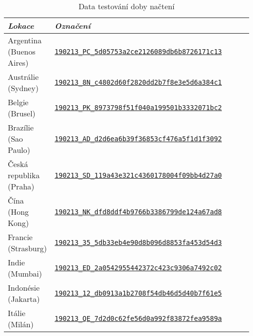 \documentclass[a4paper, 12pt]{article}
\newcommand{\ra}[1]{\renewcommand{\arraystretch}{#1}} %
\begin{document}
  \begin{table}[H]
    \caption{Data testování doby načtení}
    \label{tab:Data testování doby načtení}
    \footnotesize
    \centering
    \ra{1.3}
    \begin{tabular}{*5l}
      \toprule
      \emph{Lokace}            & \emph{Označení}                      \\ \midrule
      Argentina (Buenos Aires)        & \href{https://www.webpagetest.org/result/190213_PC_5d05753a2ce2126089db6b8726171c13}{\texttt{190213\_PC\_5d05753a2ce2126089db6b8726171c13}} \\
      Austrálie (Sydney)              & \href{https://www.webpagetest.org/result/190213_8N_c4802d60f2820dd2b7f8e3e5d6a384c1}{\texttt{190213\_8N\_c4802d60f2820dd2b7f8e3e5d6a384c1}} \\
      Belgie (Brusel)                 & \href{https://www.webpagetest.org/result/190213_PK_8973798f51f040a199501b3332071bc2}{\texttt{190213\_PK\_8973798f51f040a199501b3332071bc2}} \\
      Brazílie (Sao Paulo)            & \href{https://www.webpagetest.org/result/190213_AD_d2d6ea6b39f36853cf476a5f1d1f3092}{\texttt{190213\_AD\_d2d6ea6b39f36853cf476a5f1d1f3092}} \\
      Česká republika (Praha)         & \href{https://www.webpagetest.org/result/190213_SD_119a43e321c4360178004f09bb4d27a0}{\texttt{190213\_SD\_119a43e321c4360178004f09bb4d27a0}} \\
      Čína (Hong Kong)                & \href{https://www.webpagetest.org/result/190213_NK_dfd8ddf4b9766b3386799de124a67ad8}{\texttt{190213\_NK\_dfd8ddf4b9766b3386799de124a67ad8}} \\
      Francie (Strasburg)             & \href{https://www.webpagetest.org/result/190213_35_5db33eb4e90d8b096d8853fa453d54d3}{\texttt{190213\_35\_5db33eb4e90d8b096d8853fa453d54d3}} \\
      Indie (Mumbai)                  & \href{https://www.webpagetest.org/result/190213_ED_2a0542955442372c423c9306a7492c02}{\texttt{190213\_ED\_2a0542955442372c423c9306a7492c02}} \\
      Indonésie (Jakarta)             & \href{https://www.webpagetest.org/result/190213_12_db0913a1b2708f54db46d5d40b7f61e5}{\texttt{190213\_12\_db0913a1b2708f54db46d5d40b7f61e5}} \\
      Itálie (Milán)                  & \href{https://www.webpagetest.org/result/190213_QE_7d2d0c62fe56d0a992f83872fea9589a}{\texttt{190213\_QE\_7d2d0c62fe56d0a992f83872fea9589a}} \\

\end{tabular}
\end{table}
\end{document}
